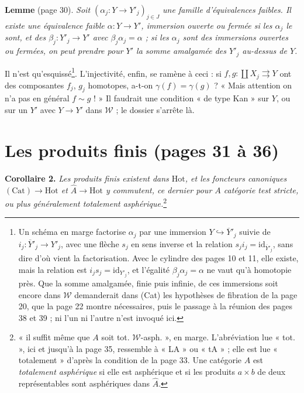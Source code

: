 \documentclass[11pt,a4paper]{article}
\begin{document}
\textbf{Lemme} (page 30). \emph{Soit $(\alpha_{j} : Y \to Y'_{j})_{j \in J}$
une famille d'équivalences faibles. Il existe une équivalence faible
$\alpha : Y \to Y'$, immersion ouverte ou fermée si les $\alpha_{j}$ le sont,
et des $\beta_{j} : Y'_{j} \to Y'$ avec $\beta_{j}\alpha_{j} = \alpha$ ; si les
$\alpha_{j}$ sont des immersions ouvertes ou fermées, on peut prendre pour $Y'$
la somme amalgamée des $Y'_{j}$ au-dessus de $Y$.}

Il n'est qu'esquissé\footnote{Un schéma en marge factorise $\alpha_{j}$ par une
immersion $Y \hookrightarrow \overline{Y}'_{j}$ suivie de
$i_{j} : \overline{Y}'_{j} \to Y'_{j}$, avec une flèche $s_{j}$ en sens
inverse et la relation $s_{j}i_{j} = \mathrm{id}_{\overline{Y}'_{j}}$, sans
dire d'où vient la factorisation. Avec le cylindre des pages 10 et 11, elle
existe, mais la relation est $i_{j}s_{j} = \mathrm{id}_{Y'_{j}}$, et l'égalité
$\beta_{j}\alpha_{j} = \alpha$ ne vaut qu'à homotopie près. Que la somme
amalgamée, finie puis infinie, de ces immersions soit encore dans
$\mathcal{W}$ demanderait dans (Cat) les hypothèses de fibration de la page
20, que la page 22 montre nécessaires, puis le passage à la réunion des pages
38 et 39 ; ni l'un ni l'autre n'est invoqué ici.}. L'injectivité, enfin, se
ramène à ceci : si $f, g : \coprod X_{j} \rightrightarrows Y$ ont des
composantes $f_{j}$, $g_{j}$ homotopes, a-t-on $\gamma(f) = \gamma(g)$ ? « Mais
attention on n'a pas en général $f \sim g$ ! » Il faudrait une condition « de
type Kan » sur $Y$, ou sur un $Y'$ avec $Y \to Y'$ dans $\mathcal{W}$ ; le
dossier s'arrête là.

\section*{Les produits finis (pages 31 à 36)}

\textbf{Corollaire 2.} \emph{Les produits finis existent dans $\mathrm{Hot}$,
et les foncteurs canoniques $(\mathrm{Cat}) \to \mathrm{Hot}$ et
$\widehat{A} \to \mathrm{Hot}$ y commutent, ce dernier pour $A$ catégorie test
stricte, ou plus généralement totalement asphérique.}\footnote{« il suffit
même que $A$ soit tot. $\mathcal{W}$-asph. », en marge. L'abréviation lue
« tot. », ici et jusqu'à la page 35, ressemble à « LA » ou « tA » ; elle est
lue « totalement » d'après la condition de la page 33. Une catégorie $A$ est
\emph{totalement asphérique} si elle est asphérique et si les produits
$a \times b$ de deux représentables sont asphériques dans $\widehat{A}$.}
\end{document}
